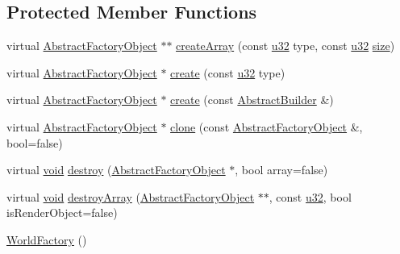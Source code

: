 \subsection*{Protected Member Functions}
\begin{DoxyCompactItemize}
\item 
virtual \mbox{\hyperlink{classnjli_1_1_abstract_factory_object}{Abstract\+Factory\+Object}} $\ast$$\ast$ \mbox{\hyperlink{classnjli_1_1_world_factory_ae5012fbab296d02bd57b4bf660bc9cac}{create\+Array}} (const \mbox{\hyperlink{_util_8h_a10e94b422ef0c20dcdec20d31a1f5049}{u32}} type, const \mbox{\hyperlink{_util_8h_a10e94b422ef0c20dcdec20d31a1f5049}{u32}} \mbox{\hyperlink{classnjli_1_1_world_factory_ad5d3fc4509c0939fd64f5d8473e915d2}{size}})
\item 
virtual \mbox{\hyperlink{classnjli_1_1_abstract_factory_object}{Abstract\+Factory\+Object}} $\ast$ \mbox{\hyperlink{classnjli_1_1_world_factory_a750b2aa5e4b856d72c629f381e671166}{create}} (const \mbox{\hyperlink{_util_8h_a10e94b422ef0c20dcdec20d31a1f5049}{u32}} type)
\item 
virtual \mbox{\hyperlink{classnjli_1_1_abstract_factory_object}{Abstract\+Factory\+Object}} $\ast$ \mbox{\hyperlink{classnjli_1_1_world_factory_ab146b0b572a8f4806637ebf25b2df26a}{create}} (const \mbox{\hyperlink{classnjli_1_1_abstract_builder}{Abstract\+Builder}} \&)
\item 
virtual \mbox{\hyperlink{classnjli_1_1_abstract_factory_object}{Abstract\+Factory\+Object}} $\ast$ \mbox{\hyperlink{classnjli_1_1_world_factory_a33abb985f896e35cea6e4913826c6a47}{clone}} (const \mbox{\hyperlink{classnjli_1_1_abstract_factory_object}{Abstract\+Factory\+Object}} \&, bool=false)
\item 
virtual \mbox{\hyperlink{_thread_8h_af1e856da2e658414cb2456cb6f7ebc66}{void}} \mbox{\hyperlink{classnjli_1_1_world_factory_a89cd6287f3762e13a950c01032639c04}{destroy}} (\mbox{\hyperlink{classnjli_1_1_abstract_factory_object}{Abstract\+Factory\+Object}} $\ast$, bool array=false)
\item 
virtual \mbox{\hyperlink{_thread_8h_af1e856da2e658414cb2456cb6f7ebc66}{void}} \mbox{\hyperlink{classnjli_1_1_world_factory_a2a3ae9f5b93cd70b470de9ed3e1edb05}{destroy\+Array}} (\mbox{\hyperlink{classnjli_1_1_abstract_factory_object}{Abstract\+Factory\+Object}} $\ast$$\ast$, const \mbox{\hyperlink{_util_8h_a10e94b422ef0c20dcdec20d31a1f5049}{u32}}, bool is\+Render\+Object=false)
\item 
\mbox{\hyperlink{classnjli_1_1_world_factory_a726158c2c7cfe4b1f1311e2c15c37f07}{World\+Factory}} ()

\end{DoxyCompactItemize}
